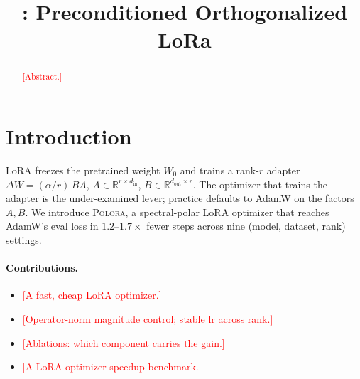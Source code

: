 \documentclass[11pt]{article}
\title{\methodname: Preconditioned Orthogonalized LoRa}  %
\author{}
\date{}
\newcommand{\R}{\mathbb{R}}
\newcommand{\DW}{\Delta W}
\newcommand{\methodname}{\textsc{Polora}\xspace}
\newcommand{\PLACEHOLDER}[1]{\textcolor{red}{[#1]}}
\theoremstyle{plain}
\theoremstyle{definition}
\theoremstyle{remark}
\begin{document}
\maketitle

\begin{abstract}
\PLACEHOLDER{Abstract.}
\end{abstract}

\section{Introduction}
\label{sec:intro}
%

LoRA \cite{lora} freezes the pretrained weight $W_0$ and trains a rank-$r$ adapter
$\DW=(\alpha/r)\,BA$, $A\in\R^{r\times d_{\mathrm{in}}}$,
$B\in\R^{d_{\mathrm{out}}\times r}$. The optimizer that trains the adapter is the
under-examined lever; practice defaults to AdamW on the factors $A,B$. We introduce
\methodname{}, a spectral-polar LoRA optimizer that reaches AdamW's eval loss in
$1.2$--$1.7\times$ fewer steps across nine (model, dataset, rank) settings.

\paragraph{Contributions.}
\begin{itemize}[leftmargin=1.5em,itemsep=2pt,topsep=2pt]
  \item \PLACEHOLDER{A fast, cheap LoRA optimizer.}
  \item \PLACEHOLDER{Operator-norm magnitude control; stable lr across rank.}
  \item \PLACEHOLDER{Ablations: which component carries the gain.}
  \item \PLACEHOLDER{A LoRA-optimizer speedup benchmark.}
\end{itemize}


\end{document}
